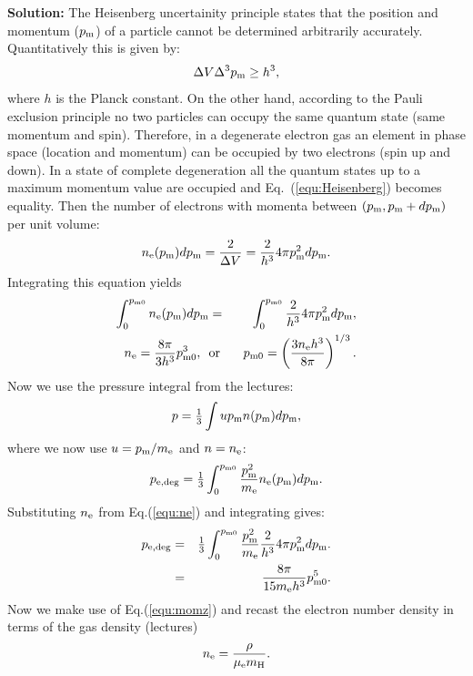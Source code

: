 \documentclass[12pt]{article}
\def\mue{\mu_{\rm e}}
\def\pmom{p_{\rm m}}
\def\pedeg{p_{\rm e,deg}}
\def\pmomz{p_{\rm m0}}
\def\onethird{{\textstyle{1\over3}}}
\begin{document}
{\bf Solution:} The Heisenberg uncertainity principle states that the
position and momentum ($\pmom$) of a particle cannot be determined
arbitrarily accurately. Quantitatively this is given by:
\begin{equation}
\Delta V \Delta^3 \pmom \geq h^3,\label{equ:Heisenberg}
\end{equation}
where $h$ is the Planck constant. On the other hand, according to the
Pauli exclusion principle no two particles can occupy the same quantum
state (same momentum and spin). Therefore, in a degenerate electron
gas an element in phase space (location and momentum) can be occupied
by two electrons (spin up and down). In a state of complete
degeneration all the quantum states up to a maximum momentum value are
occupied and Eq.~(\ref{equ:Heisenberg}) becomes equality. Then the
number of electrons with momenta between $(\pmom,\pmom+d\pmom)$ per
unit volume:
\begin{equation}
n_{\rm e}(\pmom)d\pmom = \frac{2}{\Delta V} = \frac{2}{h^3} 4\pi \pmom^2 d\pmom.\label{equ:ne}
\end{equation}
Integrating this equation yields
\begin{eqnarray}
\int_0^{\pmomz} n_{\rm e}(\pmom)d\pmom &=& \int_0^{\pmomz} \frac{2}{h^3} 4\pi \pmom^2 d\pmom,\\
n_{\rm e} = \frac{8\pi}{3 h^3} \pmomz^3,\ \ &\mbox{or}& \ \ \pmomz = \left( \frac{3n_{\rm e}h^3}{8\pi} \right)^{1/3}.\label{equ:momz}
\end{eqnarray}
Now we use the pressure integral from the lectures:
\begin{eqnarray}
p = \onethird \int u \pmom n(\pmom) d\pmom,\label{equ:pintegral}
\end{eqnarray}
where we now use $u = \pmom/m_{\rm e}$ and $n = n_{\rm e}$:
\begin{eqnarray}
\pedeg = \onethird \int_0^{\pmomz} \frac{\pmom^2}{m_{\rm e}} n_{\rm e}(\pmom) d\pmom.
\end{eqnarray}
Substituting $n_{\rm e}$ from Eq.(\ref{equ:ne}) and integrating gives:
\begin{eqnarray}
\pedeg &=& \onethird \int_0^{\pmomz} \frac{\pmom^2}{m_{\rm e}} \frac{2}{h^3} 4\pi \pmom^2 d\pmom.\\
       &=& \frac{8\pi}{15 m_{\rm e} h^3} \pmomz^5.\label{equ:pp1}
\end{eqnarray}
Now we make use of Eq.(\ref{equ:momz}) and recast the electron number
density in terms of the gas density (lectures)
\begin{equation}
n_{\rm e} = \frac{\rho}{\mue m_{\rm H}}.\label{equ:ne2}
\end{equation}
\end{document}
